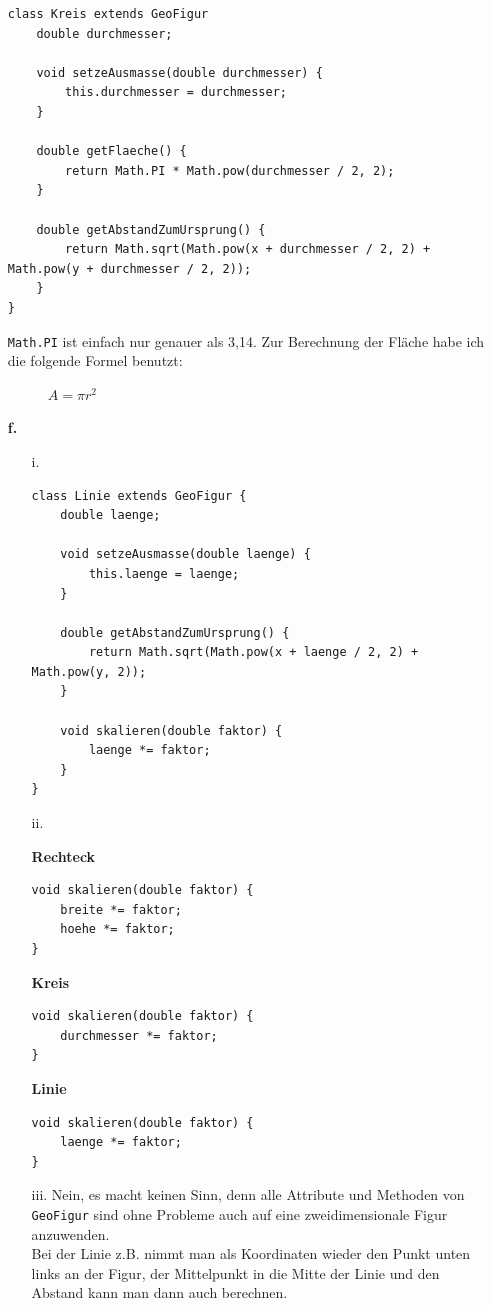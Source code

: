 \documentclass{scrartcl}   %
\begin{document}
\begin{itemize}
    \begin{lstlisting}
class Kreis extends GeoFigur 
    double durchmesser;
    
    void setzeAusmasse(double durchmesser) {
        this.durchmesser = durchmesser;
    }
    
    double getFlaeche() {
        return Math.PI * Math.pow(durchmesser / 2, 2);
    }
    
    double getAbstandZumUrsprung() {
        return Math.sqrt(Math.pow(x + durchmesser / 2, 2) + Math.pow(y + durchmesser / 2, 2));
    }
}
    \end{lstlisting}
    
    \texttt{Math.PI} ist einfach nur genauer als 3,14. Zur Berechnung der Fläche habe ich die folgende Formel benutzt:
    \begin{figure}[ht]
    	\centering
    	$A = \pi r^2$\\
    \end{figure}
    \item[\textbf{f.}]
    \begin{itemize}
        \item[i.]
        \begin{lstlisting}
class Linie extends GeoFigur {
    double laenge;
    
    void setzeAusmasse(double laenge) {
        this.laenge = laenge;
    }
    
    double getAbstandZumUrsprung() {
        return Math.sqrt(Math.pow(x + laenge / 2, 2) + Math.pow(y, 2));
    }
    
    void skalieren(double faktor) {
        laenge *= faktor;
    }
}
        \end{lstlisting}
        \item[ii.]
        \begin{itemize}
        \barrow \textbf{Rechteck}
        \begin{lstlisting}
void skalieren(double faktor) {
    breite *= faktor;
    hoehe *= faktor;
}
        \end{lstlisting}
        
        \newpage
        
        \barrow \textbf{Kreis}
        \begin{lstlisting}
void skalieren(double faktor) {
    durchmesser *= faktor;
}
        \end{lstlisting}
        \barrow \textbf{Linie}
        \begin{lstlisting}
void skalieren(double faktor) {
    laenge *= faktor;
}
        \end{lstlisting}
    \end{itemize}
        \item[iii.]
        Nein, es macht keinen Sinn, denn alle Attribute und Methoden von \texttt{GeoFigur} sind ohne Probleme auch auf eine zweidimensionale Figur anzuwenden.\\
        Bei der Linie z.B. nimmt man als Koordinaten wieder den Punkt unten links an der Figur, der Mittelpunkt in die Mitte der Linie und den Abstand kann man dann auch berechnen.
    \end{itemize}
\end{itemize}
\end{document}
